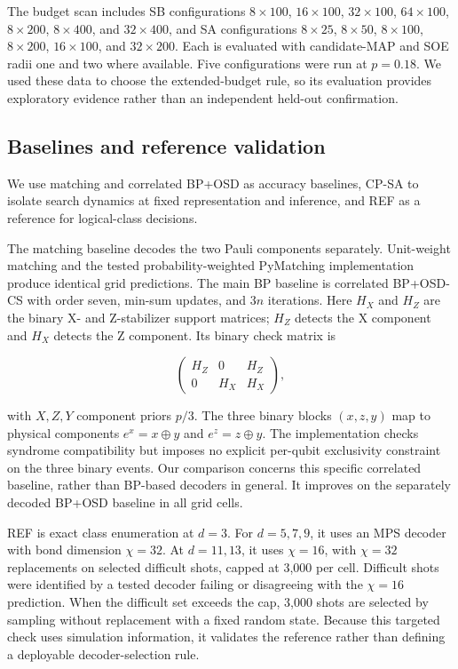 \documentclass[aps,prapplied,reprint,superscriptaddress,amsmath,amssymb,floatfix,nofootinbib]{revtex4-2}
\begin{document}
The budget scan includes SB configurations \(8\times100\),
\(16\times100\), \(32\times100\), \(64\times100\), \(8\times200\),
\(8\times400\), and \(32\times400\), and SA configurations
\(8\times25\), \(8\times50\), \(8\times100\), \(8\times200\),
\(16\times100\), and \(32\times200\). Each is evaluated with
candidate-MAP and SOE radii one and two where available. Five
configurations were run at \(p=0.18\). We used these data to choose the
extended-budget rule, so its evaluation provides exploratory evidence
rather than an independent held-out confirmation.

\subsection{Baselines and reference
validation}\label{b.-baselines-and-reference-validation}

We use matching and correlated BP+OSD as accuracy baselines, CP-SA to
isolate search dynamics at fixed representation and inference, and REF
as a reference for logical-class decisions.

The matching baseline decodes the two Pauli components separately.
Unit-weight matching and the tested probability-weighted PyMatching
implementation produce identical grid predictions. The main BP baseline
is correlated BP+OSD-CS with order seven, min-sum updates, and \(3n\)
iterations. Here \(H_X\) and \(H_Z\) are the binary X- and Z-stabilizer
support matrices; \(H_Z\) detects the X component and \(H_X\) detects
the Z component. Its binary check matrix is

\[
\begin{pmatrix}H_Z&0&H_Z\\0&H_X&H_X\end{pmatrix},
\tag{9}\label{eq:9}
\]

with \(X,Z,Y\) component priors \(p/3\). The three binary blocks
\((x,z,y)\) map to physical components \(e^x=x\oplus y\) and
\(e^z=z\oplus y\). The implementation checks syndrome compatibility but
imposes no explicit per-qubit exclusivity constraint on the three binary
events. Our comparison concerns this specific correlated baseline,
rather than BP-based decoders in general. It improves on the separately
decoded BP+OSD baseline in all grid cells.

REF is exact class enumeration at \(d=3\). For \(d=5,7,9\), it uses an
MPS decoder with bond dimension \(\chi=32\). At \(d=11,13\), it uses
\(\chi=16\), with \(\chi=32\) replacements on selected difficult shots,
capped at 3,000 per cell. Difficult shots were identified by a tested
decoder failing or disagreeing with the \(\chi=16\) prediction. When the
difficult set exceeds the cap, 3,000 shots are selected by sampling
without replacement with a fixed random state. Because this targeted
check uses simulation information, it validates the reference rather
than defining a deployable decoder-selection rule.
\end{document}

